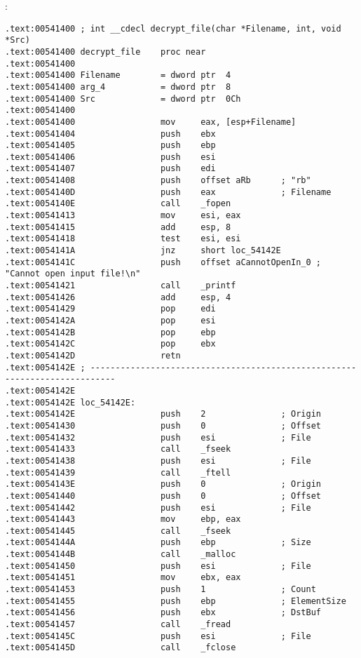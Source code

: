 :

\begin{lstlisting}
.text:00541400 ; int __cdecl decrypt_file(char *Filename, int, void *Src)
.text:00541400 decrypt_file    proc near
.text:00541400
.text:00541400 Filename        = dword ptr  4
.text:00541400 arg_4           = dword ptr  8
.text:00541400 Src             = dword ptr  0Ch
.text:00541400
.text:00541400                 mov     eax, [esp+Filename]
.text:00541404                 push    ebx
.text:00541405                 push    ebp
.text:00541406                 push    esi
.text:00541407                 push    edi
.text:00541408                 push    offset aRb      ; "rb"
.text:0054140D                 push    eax             ; Filename
.text:0054140E                 call    _fopen
.text:00541413                 mov     esi, eax
.text:00541415                 add     esp, 8
.text:00541418                 test    esi, esi
.text:0054141A                 jnz     short loc_54142E
.text:0054141C                 push    offset aCannotOpenIn_0 ; "Cannot open input file!\n"
.text:00541421                 call    _printf
.text:00541426                 add     esp, 4
.text:00541429                 pop     edi
.text:0054142A                 pop     esi
.text:0054142B                 pop     ebp
.text:0054142C                 pop     ebx
.text:0054142D                 retn
.text:0054142E ; ---------------------------------------------------------------------------
.text:0054142E
.text:0054142E loc_54142E:
.text:0054142E                 push    2               ; Origin
.text:00541430                 push    0               ; Offset
.text:00541432                 push    esi             ; File
.text:00541433                 call    _fseek
.text:00541438                 push    esi             ; File
.text:00541439                 call    _ftell
.text:0054143E                 push    0               ; Origin
.text:00541440                 push    0               ; Offset
.text:00541442                 push    esi             ; File
.text:00541443                 mov     ebp, eax
.text:00541445                 call    _fseek
.text:0054144A                 push    ebp             ; Size
.text:0054144B                 call    _malloc
.text:00541450                 push    esi             ; File
.text:00541451                 mov     ebx, eax
.text:00541453                 push    1               ; Count
.text:00541455                 push    ebp             ; ElementSize
.text:00541456                 push    ebx             ; DstBuf
.text:00541457                 call    _fread
.text:0054145C                 push    esi             ; File
.text:0054145D                 call    _fclose
\end{lstlisting}

